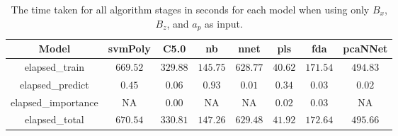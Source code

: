 \begin{table}[!ht]
	\centering
	\begin{tabular}{|c|c|c|c|c|c|c|c|}
		\hline
		Model & svmPoly & C5.0 & nb & nnet & pls & fda & pcaNNet \\ \hline
		elapsed_train & $669.52$ & $329.88$ & $145.75$ & $628.77$ & $40.62$ & $171.54$ & $494.83$ \\ \hline
		elapsed_predict & $0.45$ & $0.06$ & $0.93$ & $0.01$ & $0.34$ & $0.03$ & $0.02$ \\ \hline
		elapsed_importance & NA & $0.00$ & NA & NA & $0.02$ & $0.03$ & NA \\ \hline
		elapsed_total & $670.54$ & $330.81$ & $147.26$ & $629.48$ & $41.92$ & $172.64$ & $495.66$ \\ \hline
	\end{tabular}
	\caption{The time taken for all algorithm stages in seconds for each model when using only $B_{x}$, $B_{z}$, and $a_{p}$ as input.}
	\label{tab:time:reverse:xzap}
\end{table}
